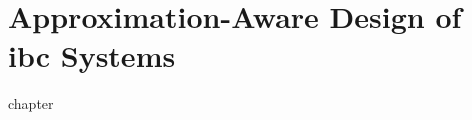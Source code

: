 \chapter{Approximation-Aware Design of \texorpdfstring{\Gls{ibc}}{IBC} Systems}
\label{chap:approximation}
\glsresetall
{chapter}